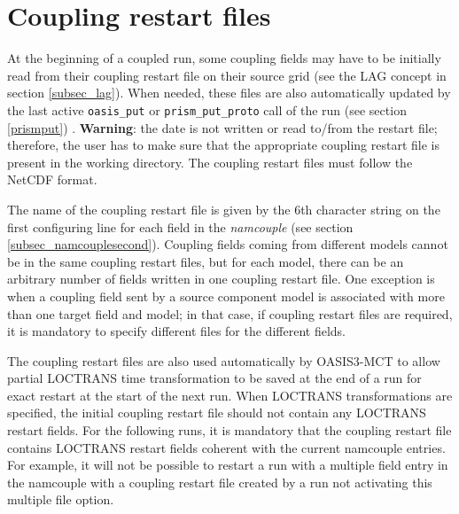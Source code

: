 \section{Coupling restart files}
\label{subsec_restartdata}

At the beginning of a coupled run, some coupling fields may have to be
initially read from their coupling restart file on their source grid
(see the LAG concept in section \ref{subsec_lag}). When
needed, these files are also automatically updated by the last active
{\tt oasis\_put} or {\tt prism\_put\_proto} call of the run (see
section \ref{prismput}) .
{\bf Warning}: the date is not written or read to/from the restart
file; therefore, the user has to make sure that the appropriate
coupling restart file is present in the working directory. The
coupling restart files must follow the NetCDF format.


The name of the coupling restart file is given by the 6th character
string on the first configuring line for each field in the {\it
  namcouple} (see section \ref{subsec_namcouplesecond}). Coupling
fields coming from different models cannot be in the same coupling
restart files, but for each model, there can be an arbitrary number of
fields written in one coupling restart file. One exception is when a coupling field sent by a source component model is associated with more than one target field and model; in that case, if coupling restart files are required, it is mandatory to specify different files for the different fields. 

The coupling restart files are also used automatically by OASIS3-MCT
to allow partial LOCTRANS time transformation to be saved at the end
of a run for exact restart at the start of the next run. When LOCTRANS
transformations are specified, the initial coupling restart file
should not contain any LOCTRANS restart fields. For the following
runs, it is mandatory that the coupling restart file contains LOCTRANS
restart fields coherent with the current namcouple entries. For
example, it will not be possible to restart a run with a multiple
field entry in the namcouple with a coupling restart file created by a 
run not activating this multiple file option.


